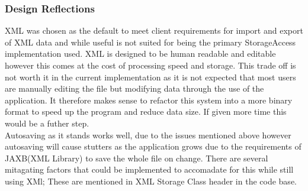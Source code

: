 \subsubsection{Design Reflections}
XML was chosen as the default to meet client requirements for import and export of XML data and while useful is not suited for being the primary StorageAccess implementation used.
XML is designed to be human readable and editable however this comes at the cost of processing speed and storage. This trade off is not worth it in the current implementation
as it is not expected that most users are manually editing the file but modifying data through the use of the application. It therefore makes sense to refactor this system into a more binary format
to speed up the program and reduce data size. If given more time this would be a futher step.\\

Autosaving as it stands works well, due to the issues mentioned above however autosaving will cause stutters as the application grows due to the requirements of JAXB(XML Library) to save the whole file on change.
There are several mitagating factors that could be implemented to accomadate for this while still using XMl; These are mentioned in XML Storage Class header in the code base. \\